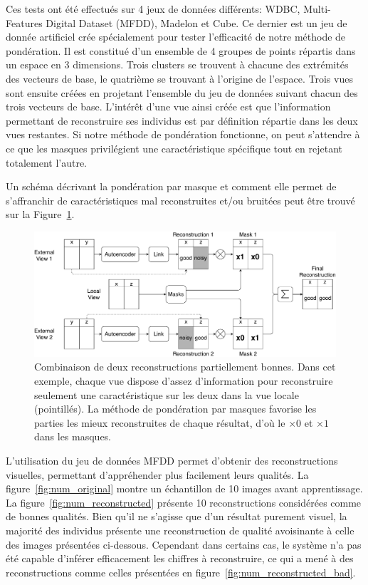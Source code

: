     Ces tests ont été effectués sur 4 jeux de données différents: WDBC, Multi-Features Digital Dataset (MFDD), Madelon et Cube. Ce dernier est un jeu de donnée artificiel crée spécialement pour tester l'efficacité de notre méthode de pondération. Il est constitué d'un ensemble de 4 groupes de points répartis dans un espace en 3 dimensions. Trois clusters se trouvent à chacune des extrémités des vecteurs de base, le quatrième se trouvant à l'origine de l'espace. Trois vues sont ensuite créées en projetant l'ensemble du jeu de données suivant chacun des trois vecteurs de base. L'intér\^{e}t d'une vue ainsi créée est que l'information permettant de reconstruire ses individus est par définition répartie dans les deux vues restantes. Si notre méthode de pondération fonctionne, on peut s'attendre à ce que les masques privilégient une caractéristique spécifique tout en rejetant totalement l'autre.
    
    Un schéma décrivant la pondération par masque et comment elle permet de s'affranchir de caractéristiques mal reconstruites et/ou bruitées peut \^{e}tre trouvé sur la Figure~\ref{fig:sum_process_mwm}.

\begin{figure}[h]
    \centering
    \includegraphics[scale=.38]{img/process_mwm}
    \caption{Combinaison de deux reconstructions partiellement bonnes. Dans cet exemple, chaque vue dispose d'assez d'information pour reconstruire seulement une caractéristique sur les deux dans la vue locale (pointillés). La méthode de pondération par masques favorise les parties les mieux reconstruites de chaque résultat, d'où le $\times 0$ et $\times 1$ dans les masques.}
\label{fig:sum_process_mwm}
\end{figure}

L'utilisation du jeu de données MFDD permet d'obtenir des reconstructions visuelles, permettant d'appréhender plus facilement leurs qualités. La figure~\ref{fig:num_original} montre un échantillon de 10 images avant apprentissage. La figure~\ref{fig:num_reconstructed} présente 10 reconstructions considérées comme de bonnes qualités. Bien qu'il ne s'agisse que d'un résultat purement visuel, la majorité des individus présente une reconstruction de qualité avoisinante à celle des images présentées ci-dessous. Cependant dans certains cas, le système n'a pas été capable d'inférer efficacement les chiffres à reconstruire, ce qui a mené à des reconstructions comme celles présentées en figure~\ref{fig:num_reconstructed_bad}.


